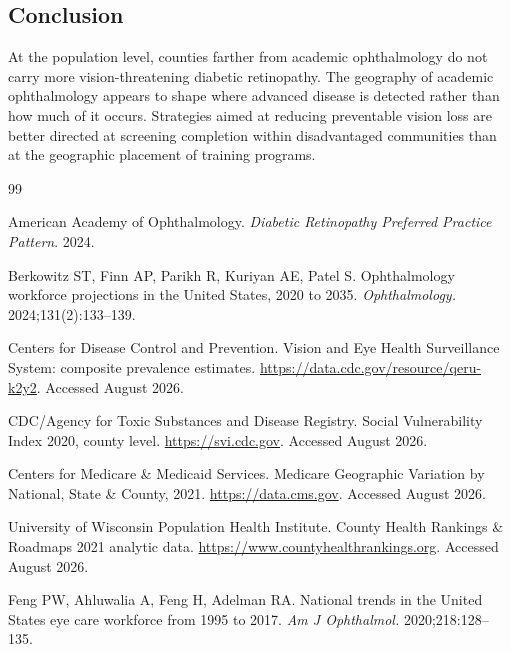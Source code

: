 \documentclass[11pt]{article}
\begin{document}
\subsection{Conclusion}

At the population level, counties farther from academic ophthalmology do not
carry more vision-threatening diabetic retinopathy. The geography of academic
ophthalmology appears to shape where advanced disease is detected rather than
how much of it occurs. Strategies aimed at reducing preventable vision loss are
better directed at screening completion within disadvantaged communities than at
the geographic placement of training programs.

\clearpage

\begin{thebibliography}{99}

American Academy of Ophthalmology. \emph{Diabetic Retinopathy Preferred Practice
Pattern}. 2024.

Berkowitz ST, Finn AP, Parikh R, Kuriyan AE, Patel S. Ophthalmology workforce
projections in the United States, 2020 to 2035. \emph{Ophthalmology.}
2024;131(2):133--139.

Centers for Disease Control and Prevention. Vision and Eye Health Surveillance
System: composite prevalence estimates. \url{https://data.cdc.gov/resource/qeru-k2y2}.
Accessed August 2026.

CDC/Agency for Toxic Substances and Disease Registry. Social Vulnerability Index
2020, county level. \url{https://svi.cdc.gov}. Accessed August 2026.

Centers for Medicare \& Medicaid Services. Medicare Geographic Variation by
National, State \& County, 2021. \url{https://data.cms.gov}. Accessed August 2026.

University of Wisconsin Population Health Institute. County Health Rankings \&
Roadmaps 2021 analytic data. \url{https://www.countyhealthrankings.org}.
Accessed August 2026.

Feng PW, Ahluwalia A, Feng H, Adelman RA. National trends in the United States
eye care workforce from 1995 to 2017. \emph{Am J Ophthalmol.} 2020;218:128--135.


\end{thebibliography}
\end{document}
